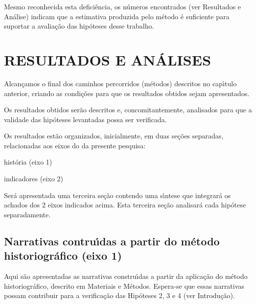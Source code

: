 \documentclass[
12pt,		%
openright,	%
twoside,  %
a4paper,			%
chapter=TITLE,		%
english,			%
french,				%
spanish,			%
brazil				%
]{USPSC-classe/USPSC}
\begin{document}
Mesmo reconhecida esta defici\^encia, os n\'umeros encontrados (ver Resultados e An\'alise) indicam que a estimativa produzida pelo m\'etodo \'e suficiente para suportar a avalia\c{c}\~ao das hip\'oteses desse trabalho.








\chapter[RESULTADOS E AN\'ALISES]{RESULTADOS E AN\'ALISES}\label{RESULTADOS E AN\'ALISES}
Alcan\c{c}amos o final dos caminhos percorridos (m\'etodos) descritos no cap\'{\i}tulo anterior, criando as condi\c{c}\~oes para que os resultados obtidos sejam apresentados.








Os resultados obtidos ser\~ao descritos e, concomitantemente, analisados para que a validade das hip\'oteses levantadas possa ser verificada.








Os resultados est\~ao organizados, inicialmente, em duas se\c{c}\~oes separadas, relacionadas aos eixos do da presente pesquisa:









\begin{alineas}
\item hist\'oria (eixo 1)
\item indicadores (eixo 2)
\end{alineas}

Ser\'a apresentada uma terceira se\c{c}\~ao contendo uma s\'{\i}ntese que integrar\'a os achados dos 2 eixos indicados acima. Esta terceira se\c{c}\~ao analisar\'a cada hip\'otese separadamente.








\section[Narrativas contru\'{\i}das a partir do m\'etodo historiogr\'afico (eixo 1)]{Narrativas contru\'{\i}das a partir do m\'etodo historiogr\'afico (eixo 1)}\label{Narrativas contru\'{\i}das a partir do m\'etodo historiogr\'afico (eixo 1)}
Aqui s\~ao apresentadas as narrativas constru\'{\i}das a partir da aplica\c{c}\~ao do m\'etodo historiogr\'afico, descrito em Materiais e M\'etodos. Espera-se que essas narrativas possam contribuir para a verifica\c{c}\~ao das Hip\'oteses 2, 3 e 4 (ver Introdu\c{c}\~ao).
\end{document}
